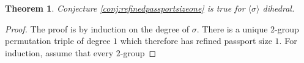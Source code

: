 \documentclass{dcthesis}
\newcommand{\ZZ}{\mathbb Z}
\newcommand{\wt}[1]{\widetilde{#1}}
\DeclareMathOperator{\Aut}{Aut}
\numberwithin{equation}{section}
\newtheorem{theorem}[equation]{Theorem}
\theoremstyle{definition}
\theoremstyle{remark}
\begin{document}
{{{      %
    \begin{theorem}
      \label{thm:conjecturedihedral}
      Conjecture
      \ref{conj:refinedpassportsizeone}
      is true for
      $\langle\sigma\rangle$
      dihedral.
    \end{theorem}
    \begin{proof}
      The proof is by induction on the
      degree of $\sigma$.
      There is a unique $2$-group permutation
      triple of degree $1$ which
      therefore has refined passport size $1$.
      For induction,
      assume that every $2$-group

\end{proof}}}}
\end{document}
